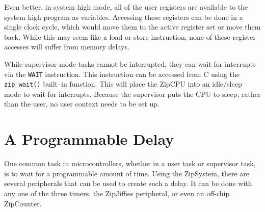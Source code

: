 \documentclass{gqtekspec}
\begin{document}
Even better, in system high mode, all of the user registers are available
to the system high program as variables.  Accessing these registers can be
done in a single clock cycle, which would move them to the active register
set or move them back.  While this may seem like a load or store instruction,
none of these register accesses will suffer from memory delays.

While supervisor mode tasks cannot be interrupted, they can wait for
interrupts via the {\tt WAIT} instruction.  This instruction can be accessed
from C using the {\tt zip\_wait()} built--in function.  This will place the
ZipCPU into an idle/sleep mode to wait for interrupts.  Because the
supervisor puts the CPU to sleep, rather than the user, no user context
needs to be set up.
\section{A Programmable Delay}
One common task in microcontrollers, whether in a user task or supervisor
task, is to wait for a programmable amount of time.  Using the ZipSystem,
there are several peripherals that can be used to create such a delay.
It can be done with any one of the three timers, the ZipJiffies peripheral, or
even an off-chip ZipCounter.
\end{document}
